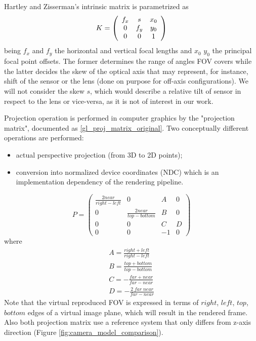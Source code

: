 Hartley and Zisserman's intrinsic matrix \cite{book_cv} is parametrized as
\begin{equation}
	K = \left ( 
    		\begin{array}{ c c c}
    		f_x & s   & x_0 \\
    		0  & f_y & y_0 \\
    		0  & 0   & 1 \\
    		\end{array}
    \right )
\label{hz_intrinsic_matrix_original}
\end{equation}
being $f_{x}$ and $f_{y}$ the horizontal and vertical focal lengths and $x_{0}$ $y_{0}$ the principal focal point offsets. The former determines the range of angles FOV covers while the latter decides the skew of the optical axis that may represent, for instance, shift of the sensor or the lens (done on purpose for off-axis configurations). We will not consider the skew $s$, which would describe a relative tilt of sensor in respect to the lens or vice-versa, as it is not of interest in our work.

Projection operation is performed in computer graphics by the "projection matrix", documented as \ref{gl_proj_matrix_original}. Two conceptually different operations are performed:
\begin{itemize}
\item actual perspective projection (from 3D to 2D points);
\item conversion into normalized device coordinates (NDC) which is an implementation dependency of the rendering pipeline.
\end{itemize}
\begin{equation}
P = \left( \begin{array}{cccc} \frac{2 near}{right - left} & 0 & A & 0 \\ 0 & \frac{2 near}{top - bottom} & B & 0 \\ 0 & 0 & C & D \\ 0 & 0 & -1 & 0 \end{array} \right)
\label{gl_proj_matrix_original}
\end{equation}
where
\begin{equation}
\begin{array}{c}
A = \frac{right + left}{right - left} \\[0.6em]
B = \frac{top + bottom}{top - bottom} \\[0.6em]
C = -\frac{far + near}{far - near}  \\[0.6em]
D = -\frac{2 \; far \; near}{far - near}
\label{gl_proj_matrix_original_details}
\end{array}
\end{equation}
Note that the virtual reproduced FOV is expressed in terms of $right$, $left$, $top$, $bottom$ edges of a virtual image plane, which will result in the rendered frame. Also both projection matrix use a reference system that only differs from z-axis direction (Figure \ref{fig:camera_model_comparison}).

